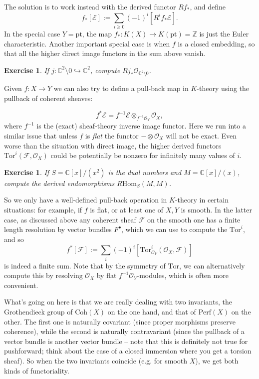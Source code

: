 \documentclass[11pt]{amsart}
\newtheorem{exercise}[dummy]{Exercise}
\theoremstyle{definition}
\newcommand{\bC}{\mathbb{C}}
\newcommand{\Ec}{\mathcal{E}}
\newcommand{\Fc}{\mathcal{F}}
\newcommand{\Oc}{\mathcal{O}}
\newcommand{\Hom}{\mathrm{Hom}}
\newcommand{\Perf}{\mathrm{Perf}}
\newcommand{\Tor}{\mathrm{Tor}}
\newcommand{\Coh}{\mathrm{Coh}}
\numberwithin{equation}{subsection}
\numberwithin{figure}{subsection}
\newcommand{\pt}{\mathrm{pt}}
\begin{document}
The solution is to work instead with the derived functor $Rf_*$,  and define
$$
f_*[\Ec] := \sum_{i\geq0} (-1)^i[R^if_*\Ec].
$$
In the special case $Y=\pt$, the map $f_*:K(X)\rightarrow K(\pt)=\mathbb{Z}$ is just the Euler characteristic. Another important special case is when $f$ is a closed embedding, so that all the higher direct image functors in the sum above vanish.

\begin{exercise}
If $j:\mathbb{C}^2\setminus 0\hookrightarrow \mathbb{C}^2$, compute $Rj_*\mathcal{O}_{\mathbb{C}^2\setminus 0}$.
\end{exercise}
Given $f:X\rightarrow Y$ we can also try to define a pull-back map in $K$-theory using the pullback of coherent sheaves:

$$
f^*\Ec = f^{-1}\Ec\otimes_{f^{-1}\Oc_Y}\Oc_X,
$$
where $f^{-1}$ is the (exact) sheaf-theory inverse image functor. Here we run into a similar issue that unless $f$ is \emph{flat} the functor $- \otimes \Oc_X$ will not be exact. Even worse than the situation with direct image, the higher derived functors $\Tor^i(\Fc,\Oc_X)$ could be potentially be nonzero for infinitely many values of $i$. 
\begin{exercise}
If $S=\bC[x]/(x^2)$ is the dual numbers and $M=\bC[x]/(x)$, compute the derived endomorphisms $R\Hom_S(M,M)$.
\end{exercise}
So we only have a well-defined pull-back operation in $K$-theory in certain situations: for example, if $f$ is flat, or at least one of $X,Y$ is smooth. In the latter case, as discussed above any coherent sheaf $\Fc$ on the smooth one has a finite length resolution by vector bundles $F^\bullet$, which we can use to compute the $\Tor^i$, and so
$$
f^*[\mathcal{F}] := \sum_i(-1)^i[\Tor_{\Oc_Y}^i(\Oc_X,\Fc)]
$$
is indeed a finite sum. Note that by the symmetry of $\Tor$, we can alternatively compute this by resolving $\Oc_X$ by flat $f^{-1}\Oc_Y$-modules, which is often more convenient. 

What's going on here is that we are really dealing with two invariants, the Grothendieck group of $\Coh(X)$ on the one hand, and that of $\Perf(X)$ on the other. The first one is naturally covariant (since proper morphisms preserve coherence), while the second is naturally contravariant (since the pullback of a vector bundle is another vector bundle -- note that this is definitely not true for pushforward; think about the case of a closed immersion where you get a torsion sheaf). So when the two invariants coincide (e.g. for smooth $X$), we get both kinds of functoriality.
\end{document}
